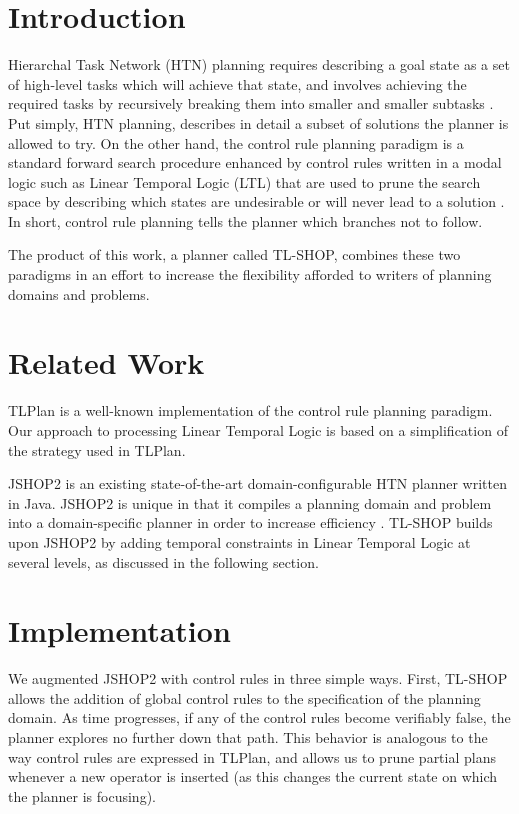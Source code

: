 \documentclass[12pt]{article}
\begin{document}


\section{Introduction}
Hierarchal Task Network (HTN) planning requires describing a goal state as a 
set of high-level tasks which will achieve that state, and involves achieving 
the required tasks by recursively breaking them into smaller and smaller 
subtasks \cite{nau2004apt}. Put simply, HTN planning, describes in detail a 
subset of  solutions the planner is allowed to try. On the other hand, the 
control rule planning paradigm is a standard forward search procedure enhanced 
by control rules written in a modal logic such as Linear Temporal Logic (LTL) 
that are used to prune the search space by describing which states are 
undesirable or will never lead to a solution \cite{nau2004apt}. In short, 
control rule planning tells the planner which branches not to follow.

The product of this work, a planner called TL-SHOP, combines these two 
paradigms in an effort to increase the flexibility afforded to writers of 
planning domains and problems.

\section{Related Work}
TLPlan\cite{bacchus1996utl} is a well-known implementation of the control rule 
planning paradigm. Our approach to processing Linear Temporal Logic is based on 
a simplification of the strategy used in TLPlan\cite{nau2004apt}.

JSHOP2\cite{ilghami:dj} is an existing state-of-the-art domain-configurable HTN 
planner written in Java. JSHOP2 is unique in that it compiles a planning domain 
and problem into a domain-specific planner in order to increase efficiency 
\cite{ilghami2003gas}. TL-SHOP builds upon JSHOP2 by adding temporal 
constraints in Linear Temporal Logic at several levels, as discussed in the 
following section.

\section{Implementation}
We augmented JSHOP2 with control rules in three simple ways. First, TL-SHOP 
allows the addition of global control rules to the specification of the 
planning domain. As time progresses, if any of the control rules become 
verifiably false, the planner explores no further down that path. This behavior 
is analogous to the way control rules are expressed in TLPlan, and allows us to 
prune partial plans whenever a new operator is inserted (as this changes the 
current state on which the planner is focusing).
\end{document}
